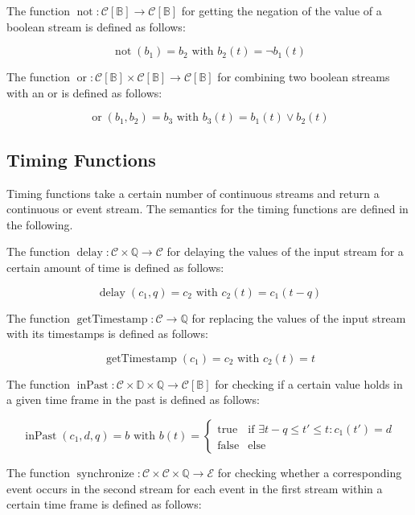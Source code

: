 The function $\operatorname{not}: \mathcal{C}[\mathbb{B}] \rightarrow \mathcal{C}[\mathbb{B}]$ for getting the negation of the value of a boolean stream is defined as follows:

\[\operatorname{not}(b_1) = b_2 \text{ with } b_2(t) = \neg b_1(t)\]

The function $\operatorname{or}: \mathcal{C}[\mathbb{B}] \times \mathcal{C}[\mathbb{B}] \rightarrow \mathcal{C}[\mathbb{B}]$ for combining two boolean streams with an or is defined as follows:

\[\operatorname{or}(b_1, b_2) = b_3 \text{ with } b_3(t) = b_1(t) \lor b_2(t)\]

\subsection{Timing Functions}

Timing functions take a certain number of continuous streams and return a continuous or event stream. The semantics for the timing functions are defined in the following.

The function $\operatorname{delay}: \mathcal{C} \times \mathbb{Q} \rightarrow \mathcal{C}$ for delaying the values of the input stream for a certain amount of time is defined as follows:

\[\operatorname{delay}(c_1,q) = c_2 \text{ with } c_2(t) = c_1(t - q)\]

The function $\operatorname{getTimestamp}: \mathcal{C} \rightarrow \mathbb{Q}$ for replacing the values of the input stream with its timestamps is defined as follows:

\[\operatorname{getTimestamp}(c_1) = c_2 \text{ with } c_2(t) = t\]

The function $\operatorname{inPast}: \mathcal{C} \times \mathbb{D} \times \mathbb{Q} \rightarrow \mathcal{C}[\mathbb{B}]$ for checking if a certain value holds in a given time frame in the past is defined as follows:

\[\operatorname{inPast}(c_1, d, q) = b \text{ with } b(t) = \begin{cases}
\text{true} & \text{if } \exists t - q \leq t' \leq t: c_1(t') = d \\
\text{false} & \text{else}
\end{cases}\]

The function $\operatorname{synchronize}: \mathcal{C} \times \mathcal{C} \times \mathbb{Q} \rightarrow \mathcal{E}$ for checking whether a corresponding event occurs in the second stream for each event in the first stream within a certain time frame is defined as follows:

